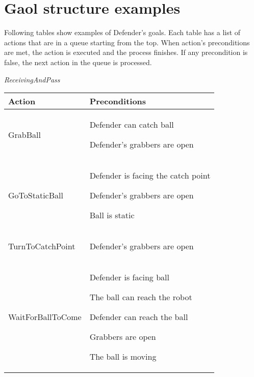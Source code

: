 \section{Gaol structure examples} \label{goalstructure}

Following tables show examples of Defender's goals. Each table has a list of actions that are in a queue starting from the top. When action's preconditions are met, the action is executed and the process finishes. If any precondition is false, the next action in the queue is processed.

\emph{ReceivingAndPass}

\begin{center}


\begin{tabular}{ | l | p{110mm} | }
\hline
\textbf{Action} & \textbf{Preconditions} \\ \hline
GrabBall &
\begin{compactitem}
\item Defender can catch ball
\item Defender's grabbers are open
\end{compactitem}  \\ \hline

GoToStaticBall &
\begin{compactitem}
\item Defender is facing the catch point
\item Defender's grabbers are open
\item Ball is static
\end{compactitem}  \\ \hline

TurnToCatchPoint &
\begin{compactitem}
\item Defender's grabbers are open
\end{compactitem}  \\ \hline

WaitForBallToCome &
\begin{compactitem}
\item Defender is facing ball
\item The ball can reach the robot
\item Defender can reach the ball
\item Grabbers are open
\item The ball is moving
\end{compactitem}  \\ \hline


\end{tabular}
\end{center}
